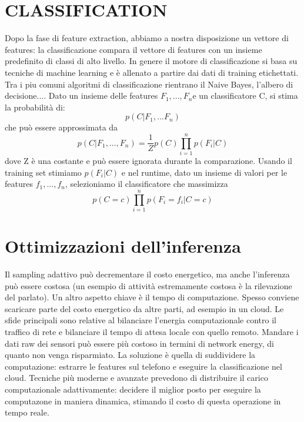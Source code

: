 \section{CLASSIFICATION}
Dopo la fase di feature extraction, abbiamo a nostra disposizione un vettore di
features: la classificazione compara il vettore di features con un insieme
predefinito di classi di alto livello. In genere il motore di classificazione si
basa su tecniche di machine learning e è allenato a partire dai dati di training
etichettati. Tra i piu comuni algoritmi di classificazione rientrano il Naive
Bayes, l'albero di decisione....
\bigbreak
Dato un insieme delle features $F_1, ..., F_n$e un classificatore C, si stima la
probabilità di:
\begin{equation}
p(C|F_1, ...F_n)
\end{equation}
che può essere approssimata da
\begin{equation}
p(C|F_1,...,F_n)=\frac{1}{Z}p(C)\prod_{i=1}^{n}p(F_i|C)
\end{equation}
dove Z è una costante e può essere ignorata durante la comparazione. Usando il
training set stimiamo $p(F_i|C)$ e nel runtime, dato un insieme di valori per le
features $f_1, ..., f_n$, selezioniamo il classificatore che massimizza
\begin{equation}
p(C=c)\prod_{i=1}^{n}p(F_i=f_i|C=c)
\end{equation}

\section{Ottimizzazioni dell'inferenza}
Il sampling adattivo può decrementare il costo energetico, ma anche l'inferenza
può essere costosa (un esempio di attività estremamente costosa è la
rilevazione del parlato). Un altro aspetto chiave è il tempo di computazione.
Spesso conviene scaricare parte del costo energetico da altre parti, ad esempio
in un cloud.
Le sfide principali sono relative al bilanciare l'energia computazionale contro
il traffico di rete e bilanciare il tempo di attesa locale con quello remoto.
Mandare i dati raw dei sensori può essere più costoso in termini di network
energy, di quanto non venga risparmiato. La soluzione è quella di suddividere la
computazione: estrarre le features sul telefono e eseguire la classificazione
nel cloud. Tecniche più moderne e avanzate prevedono di distribuire il carico
computazionale adattivamente: decidere il miglior posto per eseguire la
computazone in maniera dinamica, stimando il costo di questa operazione in tempo
reale.
